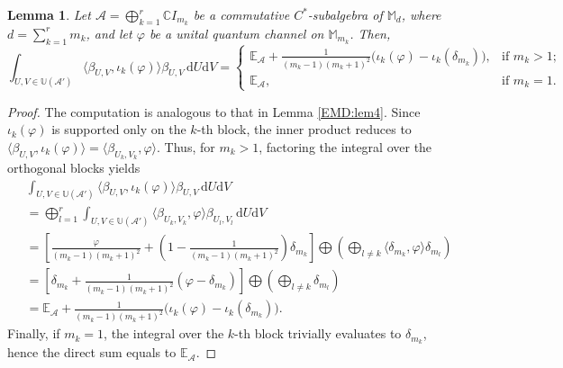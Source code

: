 \documentclass[11pt,reqno]{amsart}
\theoremstyle{definition}
\theoremstyle{plain}
\newtheorem{lem}[defn]{Lemma}
\theoremstyle{remark}
\numberwithin{equation}{section}%
\begin{document}
    
    
    \begin{lem}\label{EMD:lem8}
    	Let $\mathcal{A} = \bigoplus_{k=1}^r \mathbb{C}I_{m_k}$ be a commutative $C^*$-subalgebra of $\mathbb{M}_d$, where $d = \sum_{k=1}^r m_k$, and let $\varphi$ be a unital quantum channel on $\mathbb{M}_{m_k}$. Then,
    	\small
    	\[
    	\int_{U,V \in \mathbb{U}(\mathcal{A}')} \langle \beta_{U,V}, \iota_k(\varphi) \rangle \beta_{U,V} \, \mathrm{d}U\mathrm{d}V = 
    	\begin{cases}
    		\mathbb{E}_{\mathcal{A}} + \frac{1}{(m_k-1)(m_k+1)^2} \big( \iota_k(\varphi) - \iota_k(\delta_{m_k}) \big), & \text{if } m_k > 1; \\
    		\mathbb{E}_{\mathcal{A}}, & \text{if } m_k = 1.
    	\end{cases}
    	\]
    	\normalsize
    \end{lem}
    
    
    
    \begin{proof}
    	The computation is analogous to that in Lemma \ref{EMD:lem4}. Since $\iota_k(\varphi)$ is supported only on the $k$-th block, the inner product reduces to $\langle \beta_{U,V}, \iota_k(\varphi) \rangle = \langle \beta_{U_k,V_k}, \varphi \rangle$. Thus, for $m_k > 1$, factoring the integral over the orthogonal blocks yields
    	\begin{align*}
    		&\int_{U,V \in \mathbb{U}(\mathcal{A}')} \langle \beta_{U,V}, \iota_k(\varphi) \rangle \beta_{U,V} \, \mathrm{d}U\mathrm{d}V \\
    		&= \bigoplus_{l=1}^r \int_{U,V \in \mathbb{U}(\mathcal{A}')} \langle \beta_{U_k,V_k}, \varphi \rangle \beta_{U_l,V_l} \, \mathrm{d}U\mathrm{d}V \\
    		&= \left[ \frac{\varphi}{(m_k-1)(m_k+1)^2} + \left(1-\frac{1}{(m_k-1)(m_k+1)^2}\right)\delta_{m_k} \right] \bigoplus \left( \bigoplus_{l \neq k} \langle \delta_{m_k}, \varphi \rangle \delta_{m_l} \right) \\
    		&= \left[ \delta_{m_k} + \frac{1}{(m_k-1)(m_k+1)^2}(\varphi - \delta_{m_k}) \right] \bigoplus \left( \bigoplus_{l \neq k} \delta_{m_l} \right) \\
    		&= \mathbb{E}_{\mathcal{A}} + \frac{1}{(m_k-1)(m_k+1)^2} \big( \iota_k(\varphi) - \iota_k(\delta_{m_k}) \big).
    	\end{align*}
    	Finally, if $m_k = 1$, the integral over the $k$-th block trivially evaluates to $\delta_{m_k}$, hence the direct sum equals to $\mathbb{E}_{\mathcal{A}}$.
    \end{proof}
    
\end{document}
